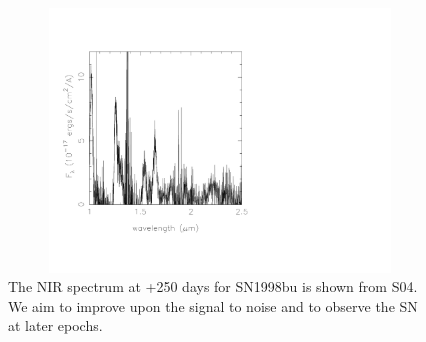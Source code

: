 \documentclass[11pt]{article}
\begin{document}

\begin{figure}
\includegraphics[width=240mm, height = 70mm]{../0570fig1.pdf}
\caption{The NIR spectrum at +250 days for SN1998bu is shown from S04. We aim to improve upon the signal to noise and to observe the SN at later epochs. }%
\label{fig:s04}
\end{figure}
\iffalse
\end{document}
